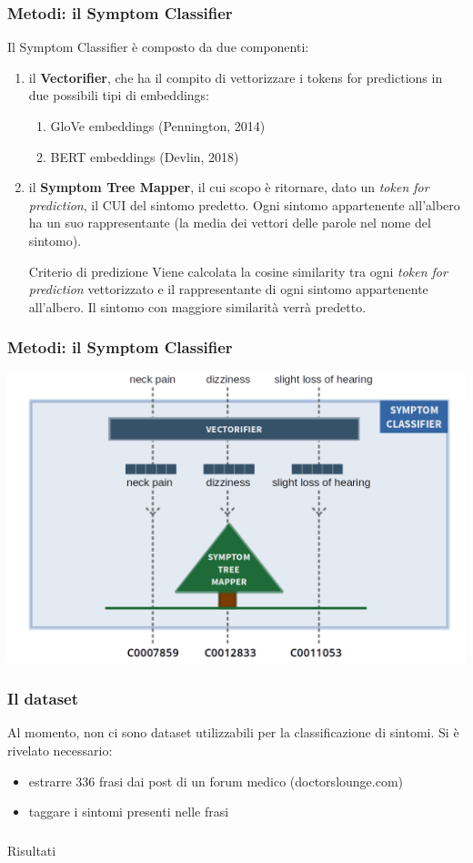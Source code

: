 \documentclass{beamer}
\begin{document}
\begin{frame}
\frametitle{Metodi: il Symptom Classifier}
Il Symptom Classifier è composto da due componenti:\pause
\begin{enumerate}
  \item il \textbf{Vectorifier}, che ha il compito di vettorizzare i tokens for predictions in due possibili tipi di embeddings:\pause
    \begin{enumerate}
      \item GloVe embeddings (Pennington, 2014)\pause
      \item BERT embeddings (Devlin, 2018)\pause
    \end{enumerate}
  \item il \textbf{Symptom Tree Mapper}, il cui scopo è ritornare, dato un \emph{token for prediction}, il CUI del sintomo predetto. Ogni sintomo appartenente all'albero ha un suo rappresentante (la media dei vettori delle parole nel nome del sintomo).
  \pause
\begin{alertblock}{Criterio di predizione}    
Viene calcolata la cosine similarity tra ogni \emph{token for prediction} vettorizzato e il rappresentante di ogni sintomo appartenente all'albero. Il sintomo con maggiore similarità verrà predetto.
\end{alertblock}
\end{enumerate}
\end{frame}

\begin{frame}
\frametitle{Metodi: il Symptom Classifier}
\includegraphics[width=\textwidth]{images/methods_overview2.png}
\end{frame}

\begin{frame}
\frametitle{Il dataset}
Al momento, non ci sono dataset utilizzabili per la classificazione di sintomi. Si è rivelato necessario:
\begin{itemize}
  \item estrarre 336 frasi dai post di un forum medico (doctorslounge.com)
  \item taggare i sintomi presenti nelle frasi
\end{itemize}
\end{frame}
\begin{frame}[c]
\frametitle{}
\begin{center}
\Huge Risultati
\end{center}
\end{frame}
\end{document}
